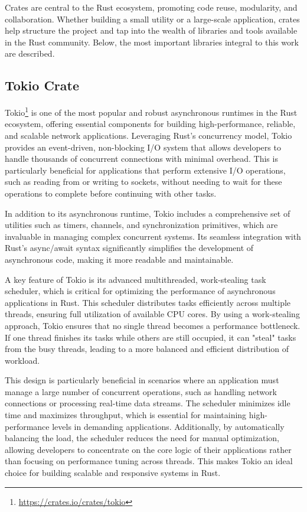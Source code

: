 Crates are central to the Rust ecosystem, promoting code reuse, modularity, and collaboration. Whether building a small utility or a large-scale application, crates help structure the project and tap into the wealth of libraries and tools available in the Rust community. Below, the most important libraries integral to this work are described.


\subsection{Tokio Crate}

Tokio\footnote{\url{https://crates.io/crates/tokio}} is one of the most popular and robust asynchronous runtimes in the Rust ecosystem, offering essential components for building high-performance, reliable, and scalable network applications. Leveraging Rust’s concurrency model, Tokio provides an event-driven, non-blocking I/O system that allows developers to handle thousands of concurrent connections with minimal overhead. This is particularly beneficial for applications that perform extensive I/O operations, such as reading from or writing to sockets, without needing to wait for these operations to complete before continuing with other tasks.

In addition to its asynchronous runtime, Tokio includes a comprehensive set of utilities such as timers, channels, and synchronization primitives, which are invaluable in managing complex concurrent systems. Its seamless integration with Rust's async/await syntax significantly simplifies the development of asynchronous code, making it more readable and maintainable.

A key feature of Tokio is its advanced multithreaded, work-stealing task scheduler, which is critical for optimizing the performance of asynchronous applications in Rust. This scheduler distributes tasks efficiently across multiple threads, ensuring full utilization of available CPU cores. By using a work-stealing approach, Tokio ensures that no single thread becomes a performance bottleneck. If one thread finishes its tasks while others are still occupied, it can "steal" tasks from the busy threads, leading to a more balanced and efficient distribution of workload.

This design is particularly beneficial in scenarios where an application must manage a large number of concurrent operations, such as handling network connections or processing real-time data streams. The scheduler minimizes idle time and maximizes throughput, which is essential for maintaining high-performance levels in demanding applications. Additionally, by automatically balancing the load, the scheduler reduces the need for manual optimization, allowing developers to concentrate on the core logic of their applications rather than focusing on performance tuning across threads. This makes Tokio an ideal choice for building scalable and responsive systems in Rust.

